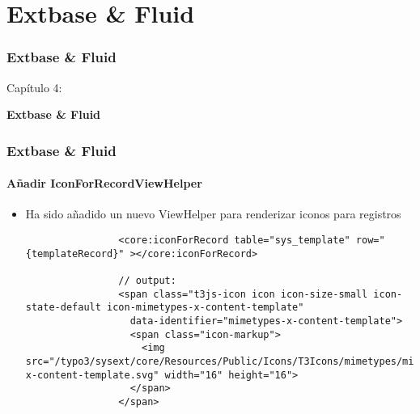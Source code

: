 %

\section{Extbase \& Fluid}
\begin{frame}[fragile]
	\frametitle{Extbase \& Fluid}

	\begin{center}\huge{Capítulo 4:}\end{center}
	\begin{center}\huge{\color{typo3darkgrey}\textbf{Extbase \& Fluid}}\end{center}

\end{frame}

\begin{frame}[fragile]
	\frametitle{Extbase \& Fluid}
	\framesubtitle{Añadir IconForRecordViewHelper}

	\lstset{basicstyle=\tiny\ttfamily}

	\begin{itemize}

		\item Ha sido añadido un nuevo ViewHelper para renderizar iconos para registros

			\begin{lstlisting}
				<core:iconForRecord table="sys_template" row="{templateRecord}" ></core:iconForRecord>

				// output:
				<span class="t3js-icon icon icon-size-small icon-state-default icon-mimetypes-x-content-template"
				  data-identifier="mimetypes-x-content-template">
				  <span class="icon-markup">
				    <img src="/typo3/sysext/core/Resources/Public/Icons/T3Icons/mimetypes/mimetypes-x-content-template.svg" width="16" height="16">
				  </span>
				</span>
			\end{lstlisting}

	\end{itemize}

\end{frame}

